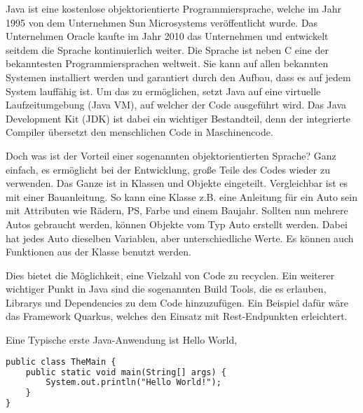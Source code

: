 Java ist eine kostenlose objektorientierte Programmiersprache, welche im Jahr 1995 von dem Unternehmen Sun Microsystems veröffentlicht wurde. Das Unternehmen Oracle kaufte im Jahr 2010 das Unternehmen und entwickelt seitdem die Sprache kontinuierlich weiter. Die Sprache ist neben C eine der bekanntesten Programmiersprachen weltweit. Sie kann auf allen bekannten Systemen installiert werden und garantiert durch den Aufbau, dass es auf jedem System lauffähig ist. Um das zu ermöglichen, setzt Java auf eine virtuelle Laufzeitumgebung (Java VM), auf welcher der Code ausgeführt wird. Das Java Development Kit (JDK) ist dabei ein wichtiger Bestandteil, denn der integrierte Compiler übersetzt den menschlichen Code in Maschinencode. 

Doch was ist der Vorteil einer sogenannten objektorientierten Sprache? Ganz einfach, es ermöglicht bei der Entwicklung, große Teile des Codes wieder zu verwenden. Das Ganze ist in Klassen und Objekte eingeteilt. Vergleichbar ist es mit einer Bauanleitung. So kann eine Klasse z.B. eine Anleitung für ein Auto sein mit Attributen wie Rädern, PS, Farbe und einem Baujahr. Sollten nun mehrere Autos gebraucht werden, können Objekte vom Typ Auto erstellt werden. Dabei hat jedes Auto dieselben Variablen, aber unterschiedliche Werte. Es können auch Funktionen aus der Klasse benutzt werden.  

Dies bietet die Möglichkeit, eine Vielzahl von Code zu recyclen. Ein weiterer wichtiger Punkt in Java sind die sogenannten Build Tools, die es erlauben, Librarys und Dependencies zu dem Code hinzuzufügen. Ein Beispiel dafür wäre das Framework Quarkus, welches den Einsatz mit Rest-Endpunkten erleichtert.   

Eine Typische erste Java-Anwendung ist Hello World,

\begin{lstlisting}[language=HTML,caption=Hello World,label=lst:impl:HelloWorld]
    public class TheMain {
    public static void main(String[] args) {
        System.out.println("Hello World!");
    }
}
  \end{lstlisting}